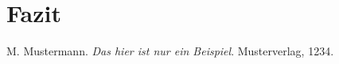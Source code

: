 \documentclass[a4,german]{article}
\begin{document}
\section{Fazit}




\begin{thebibliography}{99}
	
 M. Mustermann. \textit{Das hier ist nur ein Beispiel}. Musterverlag, 1234.

\end{thebibliography}
\end{document}
